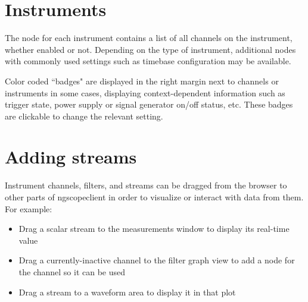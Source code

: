 \section{Instruments}

The node for each instrument contains a list of all channels on the instrument, whether enabled or not. Depending on
the type of instrument, additional nodes with commonly used settings such as timebase configuration may be available.

Color coded ``badges" are displayed in the right margin next to channels or instruments in some cases, displaying
context-dependent information such as trigger state, power supply or signal generator on/off status, etc. These badges
are clickable to change the relevant setting.

\section{Adding streams}

Instrument channels, filters, and streams can be dragged from the browser to other parts of ngscopeclient in order to
visualize or interact with data from them. For example:

\begin{itemize}
\item Drag a scalar stream to the measurements window to display its real-time value
\item Drag a currently-inactive channel to the filter graph view to add a node for the channel so it can be used
\item Drag a stream to a waveform area to display it in that plot
\end{itemize}
